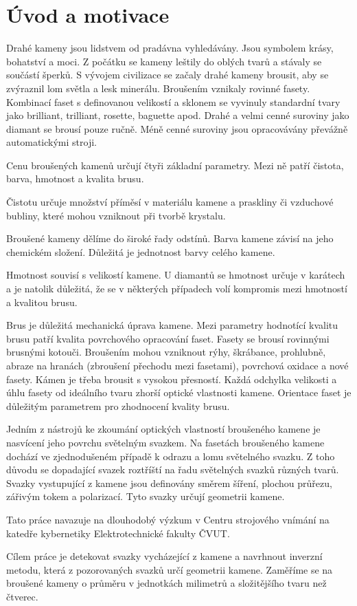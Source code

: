 \part{Úvod a motivace}

Drahé kameny jsou lidstvem od pradávna vyhledávány.
Jsou symbolem krásy, bohatství a moci. Z počátku se kameny leštily do oblých tvarů a stávaly se součástí šperků.
S vývojem civilizace se začaly drahé kameny brousit, aby se zvýraznil lom světla a lesk minerálu. Broušením vznikaly rovinné fasety. Kombinací faset s definovanou velikostí a sklonem se vyvinuly standardní tvary jako brilliant, trilliant, rosette, baguette apod. Drahé a velmi cenné suroviny jako diamant se brousí pouze ručně. Méně cenné suroviny jsou opracovávány převážně automatickými stroji.  

Cenu broušených kamenů určují čtyři základní parametry. Mezi ně patří čistota, barva, hmotnost a kvalita brusu. 

Čistotu určuje množství příměsí v materiálu kamene a praskliny či vzduchové bubliny, které mohou vzniknout při tvorbě krystalu.

Broušené kameny dělíme do široké řady odstínů. Barva kamene závisí na jeho chemickém složení. Důležitá je jednotnost barvy celého kamene.

Hmotnost souvisí s velikostí kamene. U diamantů se hmotnost určuje v karátech a je natolik důležitá, že se v některých případech volí kompromis mezi hmotností a kvalitou brusu.

Brus je důležitá mechanická úprava kamene. Mezi parametry hodnotící kvalitu brusu patří kvalita povrchového opracování faset. Fasety se brousí rovinnými brusnými kotouči. Broušením mohou vzniknout rýhy, škrábance, prohlubně, abraze na hranách (zbroušení pře\-cho\-du mezi fasetami), povrchová oxidace a nové fasety. Kámen je třeba brousit s vysokou přesností. Každá odchylka velikosti a úhlu fasety od ideálního tvaru zhorší optické vlastnosti kamene. Orientace faset je důležitým parametrem pro zhodnocení kvality brusu.

Jedním z nástrojů ke zkoumání optických vlastností broušeného kamene je nasvícení jeho povrchu světelným svazkem. Na fasetách broušeného kamene dochází ve zjednodušeném případě k odrazu a lomu světelného svazku. Z toho důvodu se dopadající svazek roztříští na řadu světelných svazků různých tvarů. Svazky vystupující z kamene jsou definovány směrem šíření, plochou průřezu, zářivým tokem a polarizací. Tyto svazky určují geometrii kamene. 

Tato práce navazuje na dlouhodobý výzkum v Centru strojového vnímání na katedře kybernetiky Elektrotechnické fakulty ČVUT. 

Cílem práce je detekovat svazky vycházející z kamene a navrhnout inverzní metodu, která z pozorovaných svazků určí geometrii kamene. Zaměříme se na broušené kameny o průměru v jednotkách milimetrů a složitějšího tvaru než čtverec.  

\clearpage
